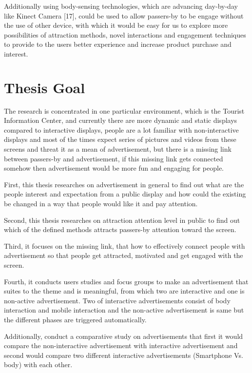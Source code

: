 Additionally using body-sensing technologies, which are advancing day-by-day like Kinect Camera [17], could be used to allow passers-by to be engage without the use of other device, with which it would be easy for us to explore more possibilities of attraction methods, novel interactions and engagement techniques to provide to the users better experience and increase product purchase and interest.

\section{Thesis Goal}
The research is concentrated in one particular environment, which is the Tourist Information Center, and currently there are more dynamic and static displays compared to interactive displays, people are a lot familiar with non-interactive displays and most of the times expect series of pictures and videos from these screens and threat it as a mean of advertisement, but there is a missing link between passers-by and advertisement, if this missing link gets connected somehow then advertisement would be more fun and engaging for people.

First, this thesis researches on advertisement in general to find out what are the people interest and expectation from a public display and how could the existing be changed in a way that people would like it and pay attention.

Second, this thesis researches on attraction attention level in public to find out which of the defined methods attracts passers-by attention toward the screen.

Third, it focuses on the missing link, that how to effectively connect people with advertisement so that people get attracted, motivated and get engaged with the screen.

Fourth, it conducts users studies and focus groups to make an advertisement that suites to the theme and is meaningful, from which two are interactive and one is non-active advertisement. Two of interactive advertisements consist of body interaction and mobile interaction and the non-active advertisement is same but the different phases are triggered automatically.

Additionally, conduct a comparative study on advertisements that first it would compare the non-interactive advertisement with interactive advertisement and second would compare two different interactive advertisements (Smartphone Vs. body) with each other.

